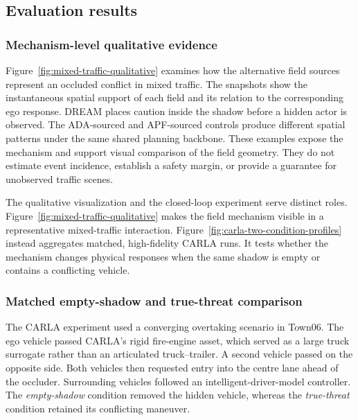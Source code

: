 \subsection{Evaluation results}
\label{sec:evaluation-results}

\subsubsection{Mechanism-level qualitative evidence}
\label{sec:mechanism-qualitative}

Figure~\ref{fig:mixed-traffic-qualitative} examines how the alternative field
sources represent an occluded conflict in mixed traffic.  The snapshots show
the instantaneous spatial support of each field and its relation to the
corresponding ego response.  DREAM places caution inside the shadow before a
hidden actor is observed.  The ADA-sourced and APF-sourced controls produce
different spatial patterns under the same shared planning backbone.  These
examples expose the mechanism and support visual comparison of the field
geometry.  They do not estimate event incidence, establish a safety margin,
or provide a guarantee for unobserved traffic scenes.

The qualitative visualization and the closed-loop experiment serve distinct
roles.  Figure~\ref{fig:mixed-traffic-qualitative} makes the field mechanism
visible in a representative mixed-traffic interaction.  Figure~\ref{fig:carla-two-condition-profiles}
instead aggregates matched, high-fidelity CARLA runs.  It tests whether the
mechanism changes physical responses when the same shadow is empty or contains
a conflicting vehicle.

\subsubsection{Matched empty-shadow and true-threat comparison}
\label{sec:carla-two-condition}

The CARLA experiment used a converging overtaking scenario in Town06.  The ego
vehicle passed CARLA's rigid fire-engine asset, which served as a large truck
surrogate rather than an articulated truck--trailer.  A second vehicle passed
on the opposite side.  Both vehicles then requested entry into the centre lane
ahead of the occluder.  Surrounding vehicles followed an
intelligent-driver-model controller.  The \emph{empty-shadow} condition removed
the hidden vehicle, whereas the \emph{true-threat} condition retained its
conflicting maneuver.

